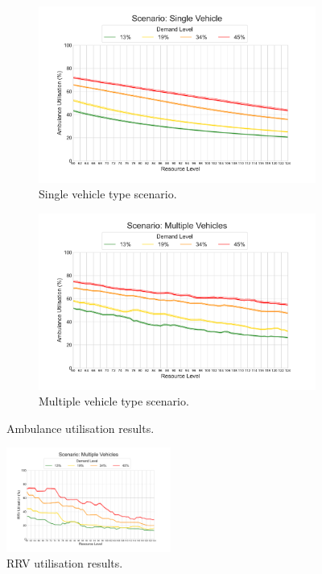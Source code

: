 \documentclass[preprint,12pt]{elsarticle}
\begin{document}
\begin{figure}
\begin{center}
\begin{subfigure}{0.48\textwidth}
\includegraphics[width=\textwidth]{img/results/single_AmbulanceUtilisation}
\caption{Single vehicle type scenario.}
\label{fig:results_ambulance_utilisation_single}
\end{subfigure}
\begin{subfigure}{0.48\textwidth}
\includegraphics[width=\textwidth]{img/results/multiple_AmbulanceUtilisation}
\caption{Multiple vehicle type scenario.}
\label{fig:results_ambulance_utilisation_multiple}
\end{subfigure}
\end{center}
\caption{Ambulance utilisation results.}
\label{fig:results_ambulance_utilisation}
\end{figure}

\begin{figure}
\begin{center}
\includegraphics[width=0.48\textwidth]{img/results/multiple_RRVUtilisation}
\end{center}
\caption{RRV utilisation results.}
\label{fig:results_rrv_utilisation_multiple}
\end{figure}
\end{document}
